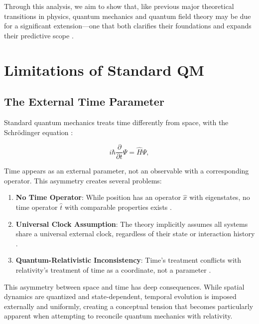 \documentclass[12pt,a4paper]{article}
\begin{document}
	Through this analysis, we aim to show that, like previous major theoretical transitions in physics, quantum mechanics and quantum field theory may be due for a significant extension—one that both clarifies their foundations and expands their predictive scope \cite{pascher_higgs_2025, pascher_photons_2025}.
	
	\section{Limitations of Standard QM}
	\label{sec:limitations}
	
	\subsection{The External Time Parameter}
	\label{subsec:time_parameter}
	
	Standard quantum mechanics treats time differently from space, with the Schrödinger equation \cite{Schrodinger1926}:
	
	\begin{equation}
		i\hbar \frac{\partial}{\partial t} \Psi = \hat{H} \Psi,
		\label{eq:schrodinger}
	\end{equation}
	
	Time appears as an external parameter, not an observable with a corresponding operator. This asymmetry creates several problems:
	
	\begin{enumerate}
		\item \textbf{No Time Operator}: While position has an operator $\hat{x}$ with eigenstates, no time operator $\hat{t}$ with comparable properties exists \cite{Pauli1980}.
		
		\item \textbf{Universal Clock Assumption}: The theory implicitly assumes all systems share a universal external clock, regardless of their state or interaction history \cite{Page1983}.
		
		\item \textbf{Quantum-Relativistic Inconsistency}: Time's treatment conflicts with relativity's treatment of time as a coordinate, not a parameter \cite{Busch1994, Peres1980}.
	\end{enumerate}
	
	This asymmetry between space and time has deep consequences. While spatial dynamics are quantized and state-dependent, temporal evolution is imposed externally and uniformly, creating a conceptual tension that becomes particularly apparent when attempting to reconcile quantum mechanics with relativity.
	
\end{document}
